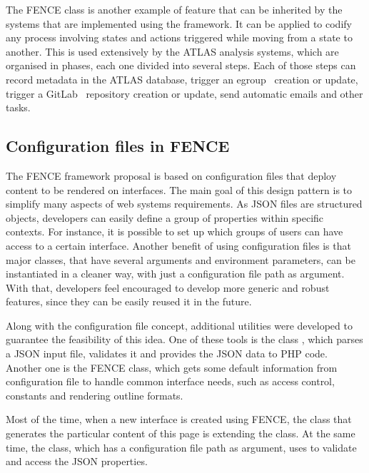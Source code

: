 The FENCE  class is another example of feature that can be inherited by the systems that are implemented using the framework.
It can be applied to codify any process involving states and actions triggered while moving from a state to another.
This is used extensively by the ATLAS analysis systems, which are organised in phases, each one divided into several steps.
Each of those steps can record metadata in the ATLAS database, trigger an egroup~\cite{egroups} creation or update, trigger a GitLab~\cite{gitlab} repository creation or update, send automatic emails and other tasks. 


\subsection{Configuration files in FENCE}%
\label{sec:Configuration_files_in_FENCE}

The FENCE framework proposal is based on configuration files that deploy content to be rendered on interfaces.
The main goal of this design pattern is to simplify many aspects of web systems requirements.
As JSON files are structured objects, developers can easily define a group of properties within specific contexts.
For instance, it is possible to set up which groups of users can have access to a certain interface.
Another benefit of using configuration files is that major classes, that have several arguments and environment parameters, can be instantiated in a cleaner way, with just a configuration file path as argument.
With that, developers feel encouraged to develop more generic and robust features, since they can be easily reused it in the future.

Along with the configuration file concept, additional utilities were developed to guarantee the feasibility of this idea.
One of these tools is the class , which parses a JSON input file, validates it and provides the JSON data to PHP code.
Another one is the FENCE  class, which gets some default information from configuration file to handle common interface needs, such as access control, constants and rendering outline formats.

Most of the time, when a new interface is created using FENCE, the class that generates the particular content of this page is extending the  class.
At the same time, the  class, which has a configuration file path as argument, uses  to validate and access the JSON properties.
